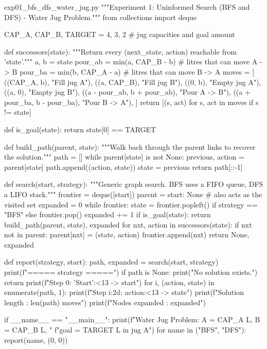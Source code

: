 \documentclass[11pt,a4paper]{article}
\begin{document}
\begin{pycode}{exp01\_bfs\_dfs\_water\_jug.py}
"""Experiment 1: Uninformed Search (BFS and DFS) - Water Jug Problem."""
from collections import deque

CAP_A, CAP_B, TARGET = 4, 3, 2       # jug capacities and goal amount


def successors(state):
    """Return every (next_state, action) reachable from 'state'."""
    a, b = state
    pour_ab = min(a, CAP_B - b)      # litres that can move A -> B
    pour_ba = min(b, CAP_A - a)      # litres that can move B -> A
    moves = [
        ((CAP_A, b), "Fill jug A"),
        ((a, CAP_B), "Fill jug B"),
        ((0, b), "Empty jug A"),
        ((a, 0), "Empty jug B"),
        ((a - pour_ab, b + pour_ab), "Pour A -> B"),
        ((a + pour_ba, b - pour_ba), "Pour B -> A"),
    ]
    return [(s, act) for s, act in moves if s != state]


def is_goal(state):
    return state[0] == TARGET


def build_path(parent, state):
    """Walk back through the parent links to recover the solution."""
    path = []
    while parent[state] is not None:
        previous, action = parent[state]
        path.append((action, state))
        state = previous
    return path[::-1]


def search(start, strategy):
    """Generic graph search. BFS uses a FIFO queue, DFS a LIFO stack."""
    frontier = deque([start])
    parent = {start: None}           # also acts as the visited set
    expanded = 0
    while frontier:
        state = frontier.popleft() if strategy == "BFS" else frontier.pop()
        expanded += 1
        if is_goal(state):
            return build_path(parent, state), expanded
        for nxt, action in successors(state):
            if nxt not in parent:
                parent[nxt] = (state, action)
                frontier.append(nxt)
    return None, expanded


def report(strategy, start):
    path, expanded = search(start, strategy)
    print(f"\n===== {strategy} =====")
    if path is None:
        print("No solution exists.")
        return
    print(f"Step  0: {'Start':<13} -> {start}")
    for i, (action, state) in enumerate(path, 1):
        print(f"Step {i:2d}: {action:<13} -> {state}")
    print(f"Solution length : {len(path)} moves")
    print(f"Nodes expanded  : {expanded}")


if __name__ == "__main__":
    print(f"Water Jug Problem: A = {CAP_A} L, B = {CAP_B} L, "
          f"goal = {TARGET} L in jug A")
    for name in ("BFS", "DFS"):
        report(name, (0, 0))
\end{pycode}
\end{document}
